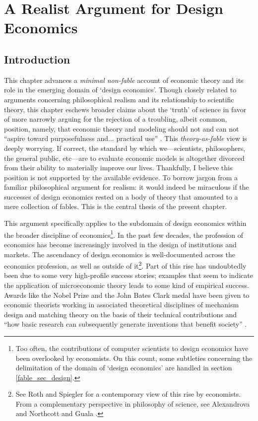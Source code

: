 \chapter{A Realist Argument for Design Economics}\label{ch_fables}

\section{Introduction}

This chapter advances a \textit{minimal non-fable} account of economic theory and its role in the emerging domain of `design economics'. Though closely related to arguments concerning philosophical realism and its relationship to scientific theory, this chapter eschews broader claims about the `truth' of science in favor of more narrowly arguing for the rejection of a troubling, albeit common, position, namely, that economic theory and modeling should not and can not ``aspire toward purposefulness and... practical use'' \autocite[35]{rubinstein2012}. This \textit{theory-as-fable} view is deeply worrying. If correct, the standard by which we---scientists, philosophers, the general public, etc---are to evaluate economic models is altogether divorced from their ability to materially improve our lives. Thankfully, I believe this position is not supported by the available evidence. To borrow jargon from a familiar philosophical argument for realism: it would indeed be miraculous if the successes of design economics rested on a body of theory that amounted to a mere collection of fables. This is the central thesis of the present chapter.

This argument specifically applies to the subdomain of design economics within the broader discipline of economics\footnote{Too often, the contributions of computer scientists to design economics have been overlooked by economists. On this count, some subtleties concerning the delimitation of the domain of `design economics' are handled in section \ref{fable_sec_design}.}. In the past few decades, the profession of economics has become increasingly involved in the design of institutions and markets. The ascendancy of design economics is well-documented across the economics profession, as well as outside of it\footnote{See Roth \autocite*{roth2019} and Spiegler \autocite*{spiegler2024} for a contemporary view of this rise by economists. From a complementary perspective in philosophy of science, see Alexandrova and Northcott \autocite*{alexandrova2009} and Guala \autocite*{guala2001}.}. Part of this rise has undoubtedly been due to some very high-profile success stories; examples that seem to indicate the application of microeconomic theory leads to some kind of empirical success. Awards like the Nobel Prize and the John Bates Clark medal have been given to economic theorists working in associated theoretical disciplines of mechanism design and matching theory on the basis of their technical contributions and ``how basic research can subsequently generate inventions that benefit society'' \autocite{nobel2020}.

